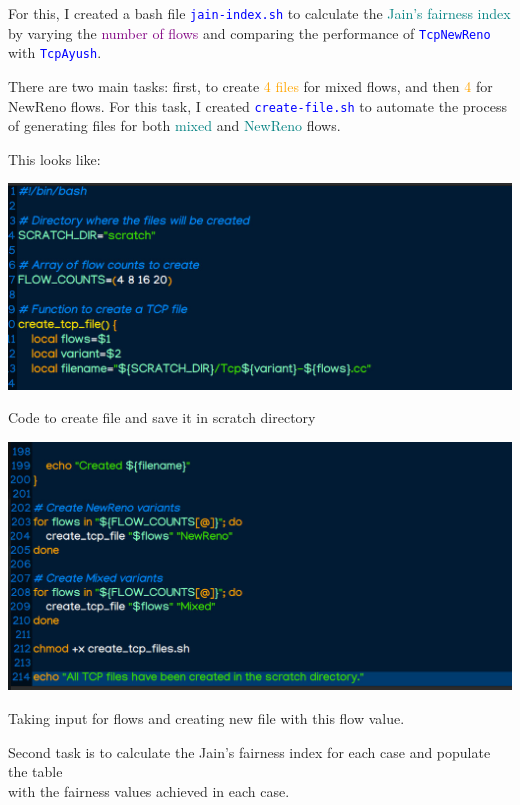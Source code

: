 \documentclass[11pt,a4paper]{article}
\begin{document}
For this, I created a bash file \texttt{\textcolor{blue}{jain-index.sh}} to calculate the \textcolor{teal}{Jain's fairness index} by varying the \textcolor{purple}{number of flows} and comparing the performance of \texttt{\textcolor{blue}{TcpNewReno}} with \texttt{\textcolor{blue}{TcpAyush}}. 

There are two main tasks: first, to create \textcolor{orange}{4 files} for mixed flows, and then \textcolor{orange}{4} for NewReno flows. For this task, I created \texttt{\textcolor{blue}{create-file.sh}} to automate the process of generating files for both \textcolor{teal}{mixed} and \textcolor{teal}{NewReno} flows.

This looks like:

\begin{center}
    \includegraphics[width=1\columnwidth]{images/create-sh.jpg}
    \caption{Code to create file and save it in scratch directory}
\end{center}

\begin{center}
    \includegraphics[width=1\columnwidth]{images/create-sh2.jpg}
    \caption{Taking input for flows and creating new file with this flow value.}
\end{center}

Second task is to calculate the Jain's fairness index for each case and populate the table \\
with the fairness values achieved in each case.\\
\end{document}
